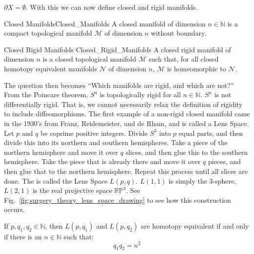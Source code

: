             $\partial{X}=\emptyset$. With this we can now define
            closed and rigid manifolds.
            \begin{ldefinition}{Closed Manifolds}{Closed_Manifolds}
                A closed manifold of dimension $n\in\mathbb{N}$ is
                a compact topological manifold $\mathcal{M}$ of
                dimension $n$ without boundary.
            \end{ldefinition}
            \begin{ldefinition}{Closed Rigid Manifolds}
                               {Closed_Rigid_Manifolds}
                A closed rigid manifold of dimension $n$
                is a closed topological manifold $\mathcal{M}$
                such that, for all closed homotopy equivalent
                manifolds $\mathcal{N}$ of dimension $n$,
                $\mathcal{M}$ is homeomorphic to $\mathcal{N}$.
            \end{ldefinition}
            The question then becomes
            ``Which manifolds are rigid, and which are not?''
            From the Poincare theorem, $S^{n}$ is topologically
            rigid for all $n\in\mathbb{N}$. $S^{n}$ is not differentially
            rigid. That is, we cannot necessarily relax the definition
            of rigidity to include diffeomorphisms.
            The first example of a non-rigid closed
            manifold came in the 1930's from Franz, Reidemeister,
            and de Rham, and is called a Lens Space.
            Let $p$ and $q$ be coprime positive integers.
            Divide $S^{3}$ into $p$ equal parts, and then divide
            this into its northern and southern hemispheres.
            Take a piece of the northern hemisphere and move
            it over $q$ slices, and then glue this to the
            southern hemisphere. Take the piece that is already
            there and move it over $q$ pieces, and then glue
            that to the northern hemisphere. Repeat this
            process until all slices are done. The is called
            the Lens Space $L(p,q)$. $L(1,1)$ is simply the
            3-sphere, $L(2,1)$ is the real projective space
            $\mathbb{RP}^{3}$.
            See Fig.~\ref{fig:surgery_theory_lens_space_drawing}
            to see how this construction occurs.
            \begin{theorem}
                If $p,q_{1},q_{2}\in\mathbb{N}$, then $L(p,q_{1})$ and
                $L(p,q_{2})$ are homotopy equivalent if and only if there
                is an $n\in\mathbb{N}$ such that:
                \begin{equation}
                    q_{1}q_{2}=n^{2}
                \end{equation}
            \end{theorem}
